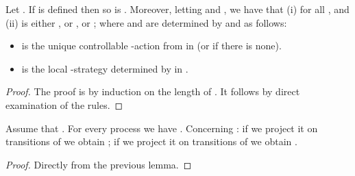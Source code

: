 \documentclass[10pt,a4paper]{article}
\begin{document}
\begin{lemma}\label{lemma:C invariant}
  Let . If  is defined then so is
  .  Moreover, letting  and
  , we have that
(i)   for all , and (ii) 
   is either , or , or
  ; where  and  are 
  determined by  and  as follows:
  \begin{itemize}
  \item  is the unique controllable -action from  in  (or
     if there is none).
  \item  is the local -strategy determined by 
    in .
  \end{itemize}
\end{lemma}
\begin{proof}
  The proof is by induction on the length of . It follows by direct
  examination of the rules.
\end{proof}

\begin{lemma}\label{lemma:projecting-runs}
  Assume that . For every process  we have
  . Concerning
  : if we project it on transitions of  we obtain
  ; if we project it  on transitions of
   we obtain .
\end{lemma}
\begin{proof}
  Directly from the previous lemma.
\end{proof}
\end{document}
